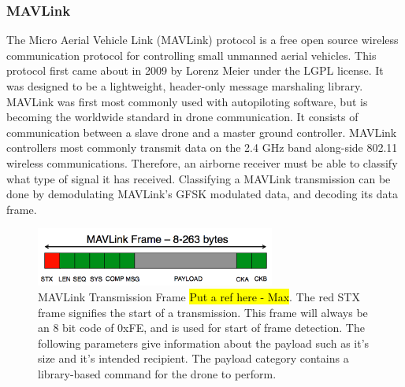 \subsubsection{MAVLink}
The Micro Aerial Vehicle Link (MAVLink) protocol is a free open source wireless communication protocol for controlling small unmanned aerial vehicles. This protocol first came about in 2009 by Lorenz Meier under the LGPL license. \cite{MAVLINK_Website}  It was designed to be a lightweight, header-only message marshaling library.  MAVLink was first most commonly used with autopiloting software, but is becoming the worldwide standard in drone communication. It consists of communication between a slave drone and a master ground controller.  MAVLink controllers most commonly transmit data on the 2.4 GHz band along-side 802.11 wireless communications. Therefore, an airborne receiver must be able to classify what type of signal it has received. Classifying a MAVLink transmission can be done by demodulating MAVLink's GFSK modulated data, and decoding its data frame. 
\begin{figure}[ht]
\centering
\includegraphics[width=0.70\textwidth]{img/mavlink-packet.png}
\caption{MAVLink Transmission Frame \hl{Put a ref here - Max}. The red STX frame signifies the start of a transmission. This frame will always be an 8 bit code of 0xFE, and is used for start of frame detection. The following parameters give information about the payload such as it's size and it's intended recipient.  The payload category contains a library-based command for the drone to perform.}
\label{fig:MAVlink_frame}
\end{figure} \par
